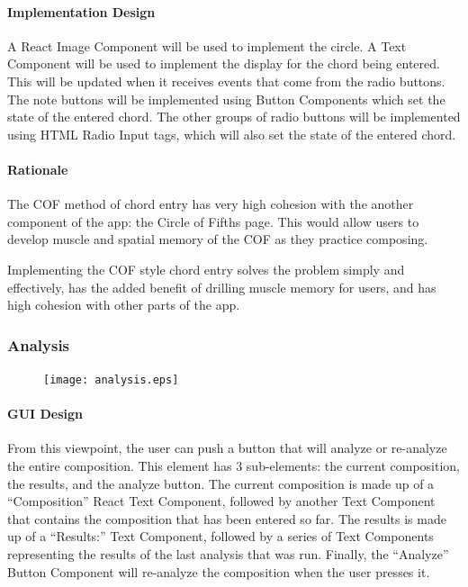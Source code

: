 \documentclass[onecolumn, draftclsnofoot,10pt, compsoc]{IEEEtran}
\begin{document}
\paragraph{Implementation Design}
A React Image Component will be used to implement the circle.
A Text Component will be used to implement the display for the chord being entered.
This will be updated when it receives events that come from the radio buttons.
The note buttons will be implemented using Button Components which set the state of the entered chord.
The other groups of radio buttons will be implemented using HTML Radio Input tags, which will also set the state of the entered chord.

\paragraph{Rationale}
The COF method of chord entry has very high cohesion with the another component of the app: the Circle of Fifths page.
This would allow users to develop muscle and spatial memory of the COF as they practice composing.

Implementing the COF style chord entry solves the problem simply and effectively, has the added benefit of drilling muscle memory for users, and has high cohesion with other parts of the app.

\subsubsection{Analysis}

\begin{figure}[H]
    \centering
    \texttt{[image: analysis.eps]}
\end{figure}

\paragraph{GUI Design}
From this viewpoint, the user can push a button that will analyze or re-analyze the entire composition.
This element has 3 sub-elements: the current composition, the results, and the analyze button.
The current composition is made up of a “Composition” React Text Component, followed by another Text Component that contains the composition that has been entered so far.
The results is made up of a “Results:” Text Component, followed by a series of Text Components representing the results of the last analysis that was run.
Finally, the “Analyze” Button Component will re-analyze the composition when the user presses it.
\end{document}
